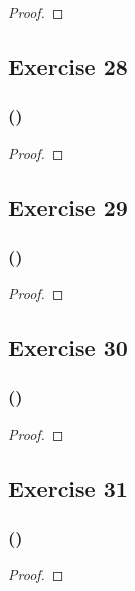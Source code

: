 \documentclass[14pt]{extarticle}
\begin{document}
\begin{proof}

\end{proof}

\subsection{Exercise 28}

\subsubsection{()}

\begin{proof}

\end{proof}

\subsection{Exercise 29}

\subsubsection{()}

\begin{proof}

\end{proof}

\subsection{Exercise 30}

\subsubsection{()}

\begin{proof}

\end{proof}

\subsection{Exercise 31}

\subsubsection{()}

\begin{proof}

\end{proof}
\end{document}
